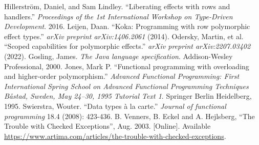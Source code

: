\documentclass[conference]{IEEEtran}
\begin{document}
\begin{thebibliography}{00}
         Hillerström, Daniel, and Sam Lindley. ``Liberating effects with rows and handlers.'' \textit{Proceedings of the 1st International Workshop on Type-Driven Development}. 2016.
         Leijen, Daan. ``Koka: Programming with row polymorphic effect types.'' \textit{arXiv preprint arXiv:1406.2061} (2014).
         Odersky, Martin, et al. ``Scoped capabilities for polymorphic effects.'' \textit{arXiv preprint arXiv:2207.03402} (2022).
         Gosling, James. \textit{The Java language specification}. Addison-Wesley Professional, 2000.
         Jones, Mark P. ``Functional programming with overloading and higher-order polymorphism.'' \textit{Advanced
        Functional Programming: First International Spring School on Advanced
        Functional Programming Techniques Båstad, Sweden, May 24–30, 1995
        Tutorial Text 1}. Springer Berlin Heidelberg, 1995.
         Swierstra, Wouter. ``Data types à la carte.'' \textit{Journal of functional programming} 18.4 (2008): 423-436.
         B. Venners, B. Eckel and A. Hejlsberg, ``The Trouble with Checked Exceptions'', Aug. 2003. [Online]. Available \url{https://www.artima.com/articles/the-trouble-with-checked-exceptions}.
    \end{thebibliography}
\end{document}
